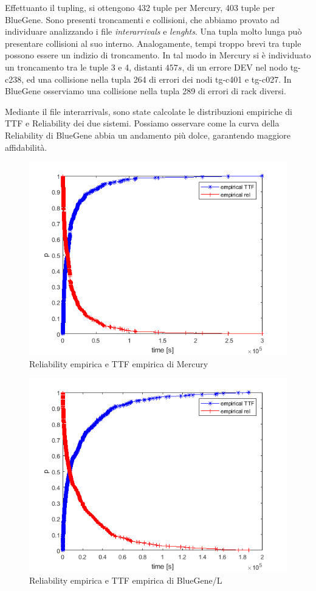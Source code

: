 	Effettuanto il tupling, si ottengono 432 tuple per Mercury, 403 tuple per BlueGene. Sono presenti troncamenti e collisioni, che abbiamo provato ad individuare analizzando i file \emph{interarrivals} e \emph{lenghts}. Una tupla molto lunga può presentare collisioni al suo interno. Analogamente, tempi troppo brevi tra tuple possono essere un indizio di troncamento. In tal modo in Mercury si è individuato un troncamento tra le tuple 3 e 4, distanti $457s$, di un errore DEV nel nodo tg-c238, ed una collisione nella tupla 264 di errori dei nodi tg-c401 e tg-c027. In BlueGene osserviamo una collisione nella tupla 289 di errori di rack diversi.\par
	Mediante il file interarrivals, sono state calcolate le distribuzioni empiriche di TTF e Reliability dei due sistemi. Possiamo osservare come la curva della Reliability di BlueGene abbia un andamento più dolce, garantendo maggiore affidabilità.
	\begin{figure}[H]
		\centering
		\includegraphics[scale=0.7]{./immagine/emprelM.png}
		\caption{Reliability empirica e TTF empirica di Mercury}
		\label{fig:ffda-emprelM}
	\end{figure}
	\begin{figure}[H]
		\centering
		\includegraphics[scale=0.7]{./immagine/emprelBG.png}
		\caption{Reliability empirica e TTF empirica di BlueGene/L}
		\label{fig:ffda-emprelBG}
	\end{figure}
